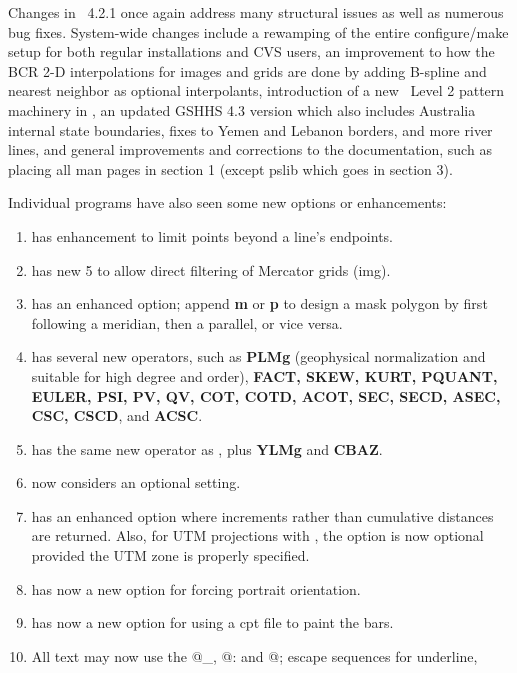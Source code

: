 Changes in \GMT\ 4.2.1 once again address many structural issues as well as numerous bug fixes.
System-wide changes include a rewamping of the entire configure/make setup for both regular
installations and CVS users, an improvement to how the BCR 2-D interpolations for images and grids
are done by adding B-spline and nearest neighbor as optional interpolants, introduction of
a new \PS\ Level 2 pattern machinery in , an updated GSHHS 4.3 version which
also includes Australia internal state
boundaries, fixes to Yemen and Lebanon borders, and more river lines, and general
improvements and corrections to the documentation, such as placing all man pages in section 1
(except pslib which goes in section 3).

Individual programs have also seen some new options or enhancements:
\begin{enumerate}
\item {} has enhancement  to limit points beyond a line's endpoints.
\item {} has new 5 to allow direct filtering of Mercator grids (img).
\item {} has an enhanced  option; append {\bf m} or {\bf p} to design
a mask polygon by first following a meridian, then a parallel, or vice versa.
\item {} has several new operators, such as {\bf PLMg} (geophysical normalization
and suitable for high degree and order), {\bf FACT, SKEW, KURT, PQUANT, EULER, PSI, PV, QV, COT,
COTD, ACOT, SEC, SECD, ASEC, CSC, CSCD}, and {\bf ACSC}.
\item {} has the same new operator as , plus {\bf YLMg} and {\bf CBAZ}.
\item {} now considers  an optional setting.
\item {} has an enhanced  option where increments rather than 
cumulative distances are returned.  Also, for UTM projections with , the 
option is now optional provided the UTM zone is properly specified.
\item {} has now a new  option for forcing portrait orientation.
\item {} has now a new  option for using a cpt file to paint the bars.
\item {} All text may now use the @\_, @: and @; escape sequences for underline,

\end{enumerate}
